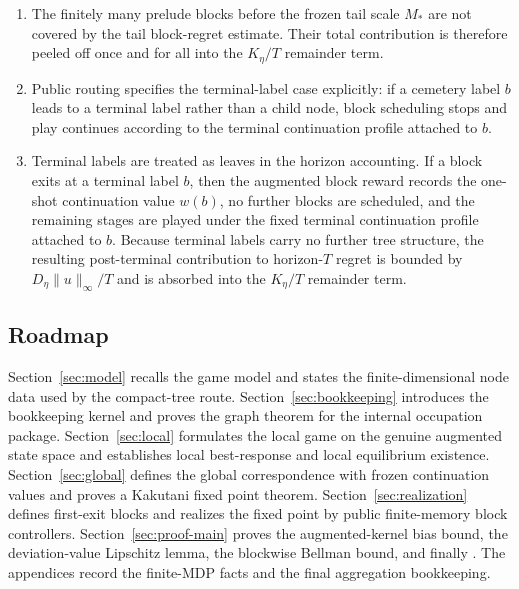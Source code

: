 \documentclass[12pt]{article}
\theoremstyle{definition}
\newcommand{\1}{\mathbf{1}}
\begin{document}
\begin{enumerate}[label=\textnormal{(\arabic*)},leftmargin=2.4em]
confined to $[0,d_\eta(C)]$ and boundary continuation values to
$[0,d_\eta(C)-1]^N$, where $d_\eta(C)$ is the remaining tree depth below $C$.
This is the correct box because each node contributes at most one unit of stage
payoff and continuation values propagate through only finitely many further
layers.
\item The finitely many prelude blocks before the frozen tail scale $M_*$ are not
covered by the tail block-regret estimate. Their total contribution is therefore
peeled off once and for all into the $K_\eta/T$ remainder term.
\item Public routing specifies the terminal-label case explicitly: if a cemetery
label $b$ leads to a terminal label rather than a child node, block scheduling
stops and play continues according to the terminal continuation profile attached
to $b$.
\item Terminal labels are treated as leaves in the horizon accounting. If a
block exits at a terminal label $b$, then the augmented block reward records the
one-shot continuation value $w(b)$, no further blocks are scheduled, and the
remaining stages are played under the fixed terminal continuation profile
attached to $b$. Because terminal labels carry no further tree structure, the
resulting post-terminal contribution to horizon-$T$ regret is bounded by
$D_\eta\|u\|_\infty/T$ and is absorbed into the $K_\eta/T$ remainder term.
\end{enumerate}

\subsection{Roadmap}


Section~\ref{sec:model} recalls the game model and states the finite-dimensional
node data used by the compact-tree route. Section~\ref{sec:bookkeeping}
introduces the bookkeeping kernel and proves the graph theorem for the internal
occupation package. Section~\ref{sec:local} formulates the local game on the
genuine augmented state space and establishes local best-response and local
equilibrium existence. Section~\ref{sec:global} defines the global correspondence
with frozen continuation values and proves a Kakutani fixed point theorem.
Section~\ref{sec:realization} defines first-exit blocks and realizes the fixed
point by public finite-memory block controllers. Section~\ref{sec:proof-main}
proves the augmented-kernel bias bound, the deviation-value Lipschitz lemma, the
blockwise Bellman bound, and finally . The appendices record the
finite-MDP facts and the final aggregation bookkeeping.
\end{document}
